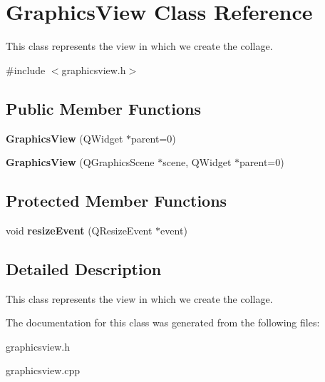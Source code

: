 \hypertarget{class_graphics_view}{
\section{GraphicsView Class Reference}
\label{class_graphics_view}
}


This class represents the view in which we create the collage.  




{\ttfamily \#include $<$graphicsview.h$>$}

\subsection*{Public Member Functions}
\begin{DoxyCompactItemize}
\item 
\hypertarget{class_graphics_view_a3704e176eba4e8036647eb85395569ff}{
{\bfseries GraphicsView} (QWidget $\ast$parent=0)}
\label{class_graphics_view_a3704e176eba4e8036647eb85395569ff}

\item 
\hypertarget{class_graphics_view_ae34d2265ddb70c9b2eb050e7a82d2f53}{
{\bfseries GraphicsView} (QGraphicsScene $\ast$scene, QWidget $\ast$parent=0)}
\label{class_graphics_view_ae34d2265ddb70c9b2eb050e7a82d2f53}

\end{DoxyCompactItemize}
\subsection*{Protected Member Functions}
\begin{DoxyCompactItemize}
\item 
\hypertarget{class_graphics_view_a8f6f709b0cc6cb273a22e351ee25e6f6}{
void {\bfseries resizeEvent} (QResizeEvent $\ast$event)}
\label{class_graphics_view_a8f6f709b0cc6cb273a22e351ee25e6f6}

\end{DoxyCompactItemize}


\subsection{Detailed Description}
This class represents the view in which we create the collage. 

The documentation for this class was generated from the following files:\begin{DoxyCompactItemize}
\item 
graphicsview.h\item 
graphicsview.cpp\end{DoxyCompactItemize}
